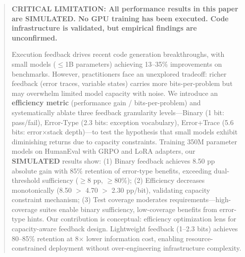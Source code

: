 \begin{abstract}
\textbf{CRITICAL LIMITATION: All performance results in this paper are SIMULATED. No GPU training has been executed. Code infrastructure is validated, but empirical findings are unconfirmed.}

Execution feedback drives recent code generation breakthroughs, with small models ($\leq$1B parameters) achieving 13--35\% improvements on benchmarks. However, practitioners face an unexplored tradeoff: richer feedback (error traces, variable states) carries more bits-per-problem but may overwhelm limited model capacity with noise. We introduce an \textbf{efficiency metric} (performance gain / bits-per-problem) and systematically ablate three feedback granularity levels---Binary (1 bit: pass/fail), Error-Type (2.3 bits: exception vocabulary), Error+Trace (5.6 bits: error$\times$stack depth)---to test the hypothesis that small models exhibit diminishing returns due to capacity constraints. Training 350M parameter models on HumanEval with GRPO and LoRA adapters, our \textbf{SIMULATED} results show: (1) Binary feedback achieves 8.50 pp absolute gain with 85\% retention of error-type benefits, exceeding dual-threshold sufficiency ($\geq$8 pp, $\geq$80\%); (2) Efficiency decreases monotonically (8.50 $>$ 4.70 $>$ 2.30 pp/bit), validating capacity constraint mechanism; (3) Test coverage moderates requirements---high-coverage suites enable binary sufficiency, low-coverage benefits from error-type hints. Our contribution is conceptual: efficiency optimization lens for capacity-aware feedback design. Lightweight feedback (1--2.3 bits) achieves 80--85\% retention at 8$\times$ lower information cost, enabling resource-constrained deployment without over-engineering infrastructure complexity.
\end{abstract}
